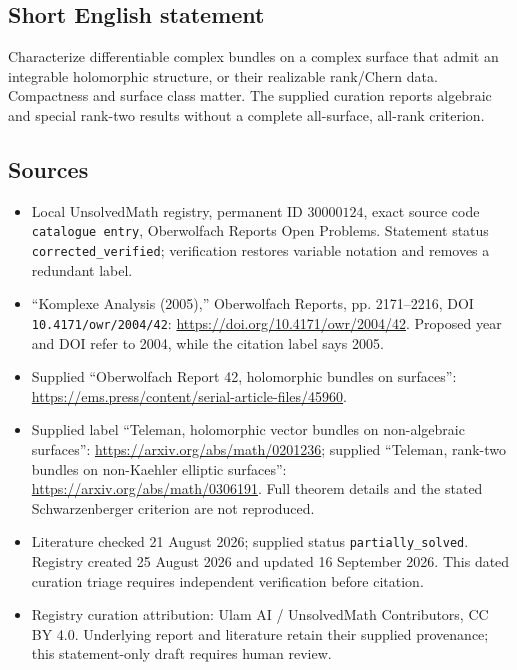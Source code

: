 \documentclass[11pt]{article}
\begin{document}
\subsection{Short English statement}
Characterize differentiable complex bundles on a complex surface that admit an integrable holomorphic structure, or their realizable rank/Chern data. Compactness and surface class matter. The supplied curation reports algebraic and special rank-two results without a complete all-surface, all-rank criterion.
\subsection{Sources}
\begin{itemize}
\item Local UnsolvedMath registry, permanent ID \(30000124\), exact source code \texttt{catalogue entry}, Oberwolfach Reports Open Problems. Statement status \texttt{corrected\_verified}; verification restores variable notation and removes a redundant label.
\item ``Komplexe Analysis (2005),'' Oberwolfach Reports, pp. 2171--2216, DOI \texttt{10.4171/owr/2004/42}: \url{https://doi.org/10.4171/owr/2004/42}. Proposed year and DOI refer to 2004, while the citation label says 2005.
\item Supplied ``Oberwolfach Report 42, holomorphic bundles on surfaces'': \url{https://ems.press/content/serial-article-files/45960}.
\item Supplied label ``Teleman, holomorphic vector bundles on non-algebraic surfaces'': \url{https://arxiv.org/abs/math/0201236}; supplied ``Teleman, rank-two bundles on non-Kaehler elliptic surfaces'': \url{https://arxiv.org/abs/math/0306191}. Full theorem details and the stated Schwarzenberger criterion are not reproduced.
\item Literature checked 21 August 2026; supplied status \texttt{partially\_solved}. Registry created 25 August 2026 and updated 16 September 2026. This dated curation triage requires independent verification before citation.
\item Registry curation attribution: Ulam AI / UnsolvedMath Contributors, CC BY 4.0. Underlying report and literature retain their supplied provenance; this statement-only draft requires human review.
\end{itemize}
\end{document}
